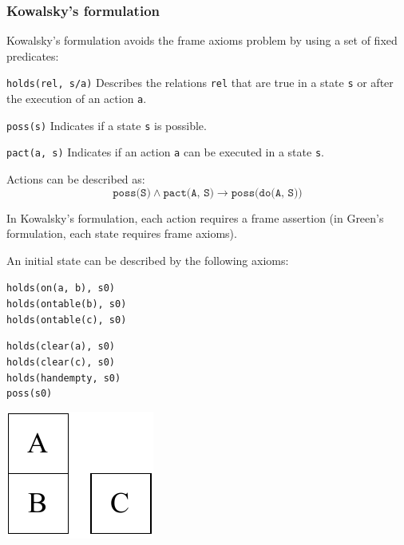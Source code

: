 \subsubsection{Kowalsky's formulation}
Kowalsky's formulation avoids the frame axioms problem by using a set of fixed predicates:
\begin{descriptionlist}
    \item[\texttt{holds(rel, s/a)}] 
        Describes the relations \texttt{rel} that are true in a state \texttt{s} or after the execution of an action \texttt{a}.
    \item[\texttt{poss(s)}]
        Indicates if a state \texttt{s} is possible.
    \item[\texttt{pact(a, s)}]  
        Indicates if an action \texttt{a} can be executed in a state \texttt{s}.
\end{descriptionlist}
Actions can be described as:
\[ \texttt{poss(S)} \land \texttt{pact(A, S)} \rightarrow \texttt{poss(do(A, S))} \]

In Kowalsky's formulation, each action requires a frame assertion (in Green's formulation, each state requires frame axioms).

\begin{example}
    An initial state can be described by the following axioms:\\[0.5em]
    \begin{minipage}{.35\linewidth}
        \centering
        \texttt{holds(on(a, b), s0)} \\
        \texttt{holds(ontable(b), s0)} \\
        \texttt{holds(ontable(c), s0)} \\
    \end{minipage}
    \begin{minipage}{.35\linewidth}
        \centering
        \texttt{holds(clear(a), s0)} \\
        \texttt{holds(clear(c), s0)} \\
        \texttt{holds(handempty, s0)} \\
        \texttt{poss(s0)} \\
    \end{minipage}
    \begin{minipage}{.2\linewidth}
        \centering
        \includegraphics[width=0.6\linewidth]{img/_moving_block_example_kowalsky.pdf}
    \end{minipage}\\[0.5em]
\end{example}

